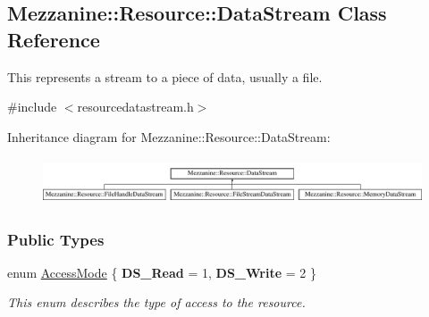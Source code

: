 \hypertarget{classMezzanine_1_1Resource_1_1DataStream}{
\subsection{Mezzanine::Resource::DataStream Class Reference}
\label{classMezzanine_1_1Resource_1_1DataStream}
}


This represents a stream to a piece of data, usually a file.  




{\ttfamily \#include $<$resourcedatastream.h$>$}

Inheritance diagram for Mezzanine::Resource::DataStream:\begin{figure}[H]
\begin{center}
\leavevmode
\includegraphics[height=1.367521cm]{classMezzanine_1_1Resource_1_1DataStream}
\end{center}
\end{figure}
\subsubsection*{Public Types}
\begin{DoxyCompactItemize}
\item 
enum \hyperlink{classMezzanine_1_1Resource_1_1DataStream_afe2916e4ed8c06130d032d99c5a532f2}{AccessMode} \{ {\bfseries DS\_\-Read} =  1, 
{\bfseries DS\_\-Write} =  2
 \}
\begin{DoxyCompactList}\small\item\em This enum describes the type of access to the resource. \item\end{DoxyCompactList}\end{DoxyCompactItemize}
